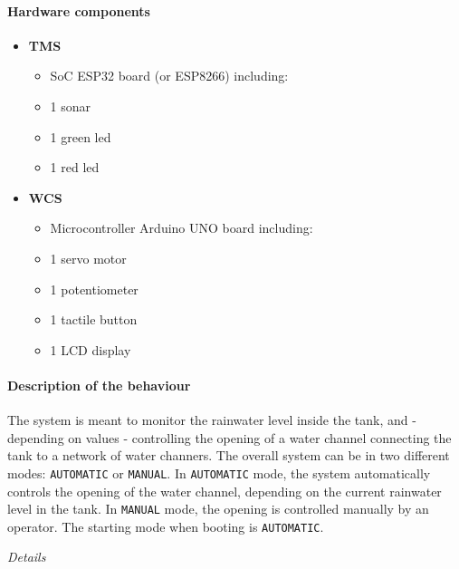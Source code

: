 \documentclass[12pt, letterpaper, twoside]{article}
\begin{document}
\paragraph*{Hardware components}

\begin{itemize}
    \item \textbf{TMS}
    \begin{itemize}
        \item SoC ESP32 board (or ESP8266) including:
        \item 1 sonar
        \item 1 green led 
        \item 1 red led
    \end{itemize}
    \item \textbf{WCS}
    \begin{itemize}
        \item Microcontroller Arduino UNO board including:
        \item 1 servo motor
        \item 1 potentiometer
        \item 1 tactile button
        \item 1 LCD display
    \end{itemize}
\end{itemize}


\paragraph*{Description of the behaviour}

The system is meant to monitor the rainwater level inside the tank, and - depending on values - controlling the opening of a water channel connecting the tank to a network of water channers.   The overall system can be in two different modes: \texttt{AUTOMATIC} or \texttt{MANUAL}. In \texttt{AUTOMATIC} mode, the system automatically controls the opening of the water channel, depending on the current rainwater level in the tank. In \texttt{MANUAL} mode, the opening is controlled manually by an operator. The starting mode when booting is \texttt{AUTOMATIC}. 

\textit{Details}
\end{document}
